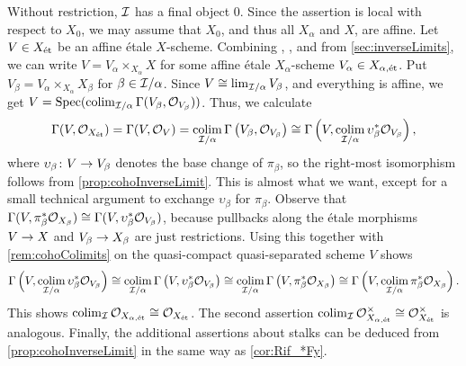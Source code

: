 \begin{proof*}
	Without restriction, $\mathcal{I}$ has a final object $0$. Since the assertion is local with respect to $X_0$, we may assume that $X_0$, and thus all $X_\alpha$ and $X$, are affine. Let $V\in X_{\mathrm{\acute{e}t}}$ be an affine étale $X$-scheme. Combining , , and  from \cref{sec:inverseLimits}, we can write $V=V_\alpha\times_{X_\alpha}X$ for some affine étale $X_\alpha$-scheme $V_\alpha\in X_{\alpha,\mathrm{\acute{e}t}}$. Put $V_\beta=V_\alpha\times_{X_\alpha}X_\beta$ for $\beta\in \mathcal{I}/\alpha$. Since $V\cong \operatorname*{lim}_{\mathcal{I}/\alpha}V_\beta$, and everything is affine, we get $V=\operatorname{Spec} (\operatorname*{colim}_{\mathcal{I}/\alpha}\operatorname{\Gamma}(V_\beta,\mathcal{O}_{V_\beta}))$. Thus, we calculate
	\begin{equation*}
	\operatorname{\Gamma}(V,\mathcal{O}_{X_{\mathrm{\acute{e}t}}})=\operatorname{\Gamma}(V,\mathcal{O}_V)=\operatorname*{colim}_{\mathcal{I}/\alpha}\operatorname{\Gamma}\big(V_\beta,\mathcal{O}_{V_\beta}\big)\cong \operatorname{\Gamma}\Big(V,\operatorname*{colim}_{\mathcal{I}/\alpha}\upsilon_\beta^*\mathcal{O}_{V_\beta}\Big)\,,
	\end{equation*}
	where $\upsilon_\beta\colon V\morphism V_\beta$ denotes the base change of $\pi_\beta$, so the right-most isomorphism follows from \cref{prop:cohoInverseLimit}. This is almost what we want, except for a small technical argument to exchange $\upsilon_\beta$ for $\pi_\beta$. Observe that $\operatorname{\Gamma}(V,\pi_\beta^*\mathcal{O}_{X_\beta})\cong \operatorname{\Gamma}(V,\upsilon_\beta^*\mathcal{O}_{V_\beta})$, because pullbacks along the étale morphisms $V\morphism X$ and $V_\beta\morphism X_\beta$ are just restrictions. Using this together with \cref{rem:cohoColimits} on the quasi-compact quasi-separated scheme $V$ shows
	\begin{equation*}
	\operatorname{\Gamma}\Big(V,\operatorname*{colim}_{\mathcal{I}/\alpha}\upsilon_\beta^*\mathcal{O}_{V_\beta}\Big)\cong \operatorname*{colim}_{\mathcal{I}/\alpha}\operatorname{\Gamma}\big(V,\upsilon_\beta^*\mathcal{O}_{V_\beta}\big)\cong \operatorname*{colim}_{\mathcal{I}/\alpha}\operatorname{\Gamma}\big(V,\pi_\beta^*\mathcal{O}_{X_\beta}\big)\cong \operatorname{\Gamma}\Big(V,\operatorname*{colim}_{\mathcal{I}/\alpha}\pi_\beta^*\mathcal{O}_{X_\beta}\Big)\,.
	\end{equation*}
	This shows $\operatorname*{colim}_{\mathcal{I}}\mathcal{O}_{X_{\alpha,\mathrm{\acute{e}t}}}\cong \mathcal{O}_{X_{\mathrm{\acute{e}t}}}$. The second assertion $\operatorname*{colim}_{\mathcal{I}}\mathcal{O}_{X_{\alpha,\mathrm{\acute{e}t}}}^\times\cong \mathcal{O}_{X_{\mathrm{\acute{e}t}}}^\times$ is analogous. Finally, the additional assertions about stalks can be deduced from \cref{prop:cohoInverseLimit} in the same way as \cref{cor:Rif_*Fy}.
\end{proof*}
